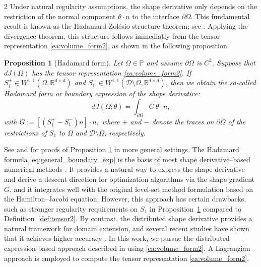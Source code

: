 \documentclass[a4paper, oneside]{article}
\newcommand{\hold}{\mathcal{D}}
\newcommand{\Sb}{S}
\newcommand{\Om}{\Omega}
\newcommand{\VV}{\theta}
\newcommand{\R}{\mathds{R}}
\newtheorem{proposition}{Proposition}
\begin{document}
\begin{multicols}{2}
	Under natural regularity assumptions, the shape derivative only depends on the restriction of the normal component $\VV\cdot n$ to the interface $\partial\Om$.  
	This fundamental result is known as the Hadamard-Zol\'esio structure theorem; see \cite[pp. 480-481]{MR2731611}.  
Applying the divergence theorem, this structure follows immediatly from the tensor representation \eqref{ea:volume_form2}, as shown in the following proposition.

	\begin{proposition}[Hadamard form]\label{tensor_relations}
	Let $\Om\in \mathds{P}$ and assume $\partial \Omega$ is $C^2$. 
	Suppose that $dJ(\Omega)$ has the tensor representation \eqref{ea:volume_form2}.
	If $\Sb_1^+\in W^{1,1}(\Om,\R^{d\times d})$ and $\Sb_1^-\in W^{1,1}(\hold\setminus\overline \Omega,\R^{d\times d})$, 	then we obtain the so-called {\it Hadamard form} or {\it boundary expression} of the shape derivative: 
	\begin{equation}
	\label{eq:general_boundary_exp}
	dJ(\Omega;\theta) = \int_{\partial \Omega} G\, \theta\cdot n,
	\end{equation}
	with
	$
	G :=  [(\Sb_1^+-\Sb_1^-)n]\cdot n,
	$
	where $+$ and $-$ denote the traces on $\partial\Om$ of the restrictions of $\Sb_1$ to $\Omega$ and $\hold\setminus\overline \Omega$, respectively. 
	\end{proposition}
	See \cite[Proposition~1]{LAURAIN2020328} and \cite[Proposition~4.3]{MR3535238} for proofs of Proposition \ref{tensor_relations} in more general settings.
	The Hadamard formula \eqref{eq:general_boundary_exp} is the basis of most shape derivative–based numerical methods \cite{MR2252743,MR2033390,vanDijk2013}. It provides a natural way to express the shape derivative and derive a descent direction for optimization algorithms via the shape gradient $G$, and it integrates well with the original level-set method formulation \cite{MR965860} based on the Hamilton–Jacobi equation.
	However, this approach has certain drawbacks, such as stronger regularity requirements on $\Sb_1$ in Proposition~\ref{tensor_relations} compared to Definition~\ref{def:tensor2}. 
	By contrast, the distributed shape derivative provides a natural framework for domain extension, and several recent studies have shown that it achieves higher accuracy \cite{MR2642680,MR3348199}.
In this work, we pursue the distributed expression-based approach described in \cite{MR3843884} using \eqref{ea:volume_form2}.
	A Lagrangian approach is employed to compute the tensor representation \eqref{ea:volume_form2}.
	

\end{multicols}
\end{document}
